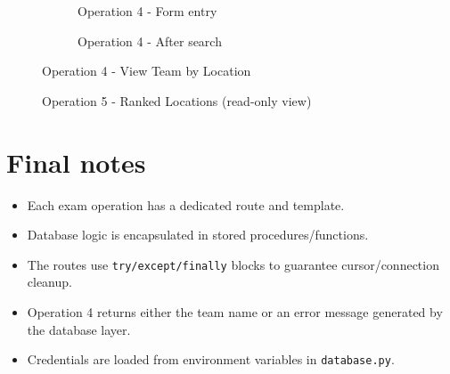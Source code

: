 \begin{figure}[H]
    \centering
    \begin{subfigure}[t]{\textwidth}
        \centering
        \caption{Operation 4 - Form entry}
    \end{subfigure}
    \vspace{0.5cm}
    \begin{subfigure}[t]{\textwidth}
        \centering
        \caption{Operation 4 - After search}
    \end{subfigure}
    \caption{Operation 4 - View Team by Location}
\end{figure}

\begin{figure}[H]
    \centering
    \caption{Operation 5 - Ranked Locations (read-only view)}
\end{figure}

\section{Final notes}

\begin{itemize}
    \item Each exam operation has a dedicated route and template.
    \item Database logic is encapsulated in stored procedures/functions.
    \item The routes use \texttt{try/except/finally} blocks to guarantee cursor/connection cleanup.
    \item Operation 4 returns either the team name or an error message generated by the database layer.
    \item Credentials are loaded from environment variables in \texttt{database.py}.
\end{itemize}







